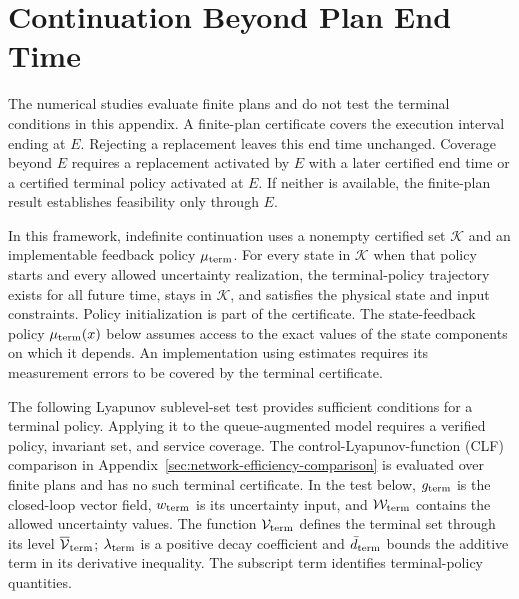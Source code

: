 \documentclass[final]{cas-sc}
\theoremstyle{definition}
\theoremstyle{plain}
\theoremstyle{definition}
\theoremstyle{plain}
\newcommand{\appref}[1]{Appendix~\ref{#1}}
\begin{document}
\section{Continuation Beyond Plan End Time}
\label{sec:terminal-backup-main}
\label{sec:terminal-backup}

The numerical studies evaluate finite plans and do not test the terminal
conditions in this appendix. A finite-plan certificate covers the execution interval ending at $E$.
Rejecting a replacement leaves this end time unchanged. Coverage beyond $E$
requires a replacement
activated by $E$ with a later certified end time or a certified terminal policy activated at $E$. If neither is available, the finite-plan result
establishes feasibility only through $E$.

In this framework, indefinite continuation uses a nonempty certified set
$\mathcal K$ and an implementable feedback policy $\mu_{\rm term}$. For every
state in $\mathcal K$ when that policy starts and every allowed uncertainty realization,
the terminal-policy trajectory exists for all future time, stays in $\mathcal K$,
and satisfies the physical state and input constraints. Policy
initialization is part of the certificate. The state-feedback policy
$\mu_{\rm term}(x)$ below assumes access to the exact values of the state components
on which it depends. An implementation using estimates requires its
measurement errors to be covered by the terminal certificate.

The following Lyapunov sublevel-set test \cite{khalil2002nonlinear}
provides sufficient conditions for a terminal policy. Applying it to the
queue-augmented model requires a verified policy, invariant set, and
service coverage. The control-Lyapunov-function (CLF) comparison in
\appref{sec:network-efficiency-comparison} is evaluated over finite plans and has
no such terminal certificate. In the test below, $g_{\rm term}$ is the
closed-loop vector field, $w_{\rm term}$ is its uncertainty input, and
$\mathcal W_{\rm term}$ contains the allowed uncertainty values. The
function $\mathcal V_{\rm term}$ defines the terminal set through its
level $\overline{\mathcal V}_{\rm term}$; $\lambda_{\rm term}$ is a
positive decay coefficient and $\bar d_{\rm term}$ bounds the additive
term in its derivative inequality. The subscript $\mathrm{term}$
identifies terminal-policy quantities.
\end{document}
